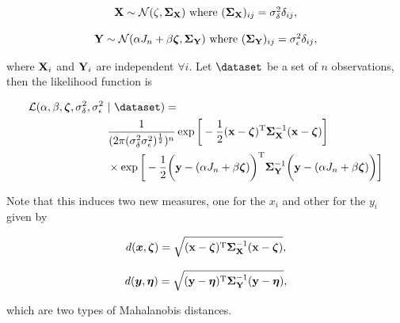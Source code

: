 \documentclass{homework}
\begin{document}
$$
\begin{array}{c}
    {\bf X} \sim \mathcal{N}(\zeta, \bm{\Sigma}_{{\bf X}}) \textnormal{ where } (\bm{\Sigma}_{{\bf X}})_{ij} = \sigma_{\delta}^2 \delta_{ij}, \\
    \\
    {\bf Y} \sim \mathcal{N}(\alpha J_n + \beta \bm{\zeta}, \bm{\Sigma}_{{\bf Y}}) \textnormal{ where } (\bm{\Sigma}_{{\bf Y}})_{ij} = \sigma_{\epsilon}^2 \delta_{ij},
\end{array}
$$

where ${\bf X}_i$ and ${\bf Y}_i$ are independent $\forall i$. Let $\dataset$ be a set of $n$ observations, then the likelihood function is 

\begin{align*}
    \mathcal{L}(\alpha, \beta, \bm{\zeta}, \sigma_{\delta}^2 ,\sigma_{\epsilon}^2 \blank &| \blank \dataset) =  \\
    & \frac{1}{(2\pi (\sigma_{\delta}^2  \sigma_{\epsilon}^2)^{\frac{1}{2}})^{n}} \exp\bigg[-\frac{1}{2}{({\bf x} - {\bm \zeta})^{\textnormal{T}} \bm{\Sigma}_{\X}^{-1} ({\bf x} - {\bm \zeta})}\bigg] \\
    & \times \exp\bigg[-\frac{1}{2}{\bigg({\bf y} - (\alpha J_n + \beta
    \bm{\zeta})\bigg)^{\textnormal{T}} \bm{\Sigma}_{\Y}^{-1}\bigg({\bf y} - (\alpha J_n + \beta \bm{\zeta})\bigg)}\bigg] 
\end{align*}

Note that this induces two new measures, one for the $x_i$ and other for the $y_i$ given by 

\begin{equation*}
    \begin{array}{c}
         d(\bm{x}, \bm{\zeta}) = \sqrt{({\bf x} - {\bm \zeta})^{\textnormal{T}} \bm{\Sigma}_{{\bf X}}^{-1} ({\bf x} - {\bm \zeta})},  \\
         \\
         d(\bm{y}, \bm{\eta}) = \sqrt{({\bf y} - {\bm \eta})^{\textnormal{T}} \bm{\Sigma}_{{\bf Y}}^{-1} ({\bf y} - {\bm \eta})},
    \end{array}
\end{equation*}

which are two types of Mahalanobis distances. 
\end{document}

